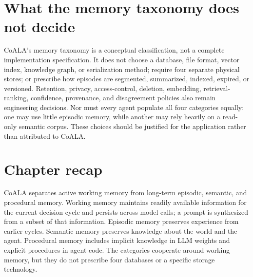 \section{What the memory taxonomy does not decide}
\label{sec:memory-taxonomy-boundaries}

CoALA's memory taxonomy is a conceptual classification, not a complete implementation specification. It does not choose a database, file format, vector index, knowledge graph, or serialization method; require four separate physical stores; or prescribe how episodes are segmented, summarized, indexed, expired, or versioned. Retention, privacy, access-control, deletion, embedding, retrieval-ranking, confidence, provenance, and disagreement policies also remain engineering decisions. Nor must every agent populate all four categories equally: one may use little episodic memory, while another may rely heavily on a read-only semantic corpus. These choices should be justified for the application rather than attributed to CoALA.

\section{Chapter recap}

\begin{chapterrecap}
CoALA separates active working memory from long-term episodic, semantic, and procedural memory. Working memory maintains readily available information for the current decision cycle and persists across model calls; a prompt is synthesized from a subset of that information. Episodic memory preserves experience from earlier cycles. Semantic memory preserves knowledge about the world and the agent. Procedural memory includes implicit knowledge in LLM weights and explicit procedures in agent code. The categories cooperate around working memory, but they do not prescribe four databases or a specific storage technology.
\end{chapterrecap}

